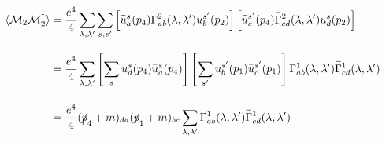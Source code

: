 \begin{solution}
\begin{enumerate}[label=(\alph*)]
    \begin{align}
        \expval{\mathcal{M}_2\mathcal{M}_2^\dagger} &= \frac{e^4}{4}  \sum_{\lambda,\lambda'} \sum_{s,s'} \left[  \overbar{u}^s_a(p_4) \Gamma^2_{ab}(\lambda,\lambda')u^{s'}_b(p_2)\right] \left[  \overbar{u}^{s'}_c(p_4)\overbar{\Gamma}^2_{cd}(\lambda,\lambda')u^s_d(p_2)\right] \nonumber \\[0.12in]
        &=  \frac{e^4}{4} \sum_{\lambda,\lambda'} \left[ \sum_{s} u^s_d(p_4) \overbar{u}^s_a(p_4) \right]  \left[ \sum_{s'}u^{s'}_b(p_1)   \overbar{u}^{s'}_c(p_1) \right] \Gamma^1_{ab}(\lambda,\lambda') \overbar{\Gamma}^1_{cd}(\lambda,\lambda') \nonumber \\[0.15in]
        &= \frac{e^4}{4}  (\pslash_4+m)_{da}  (\pslash_1+m)_{bc}  \sum_{\lambda,\lambda'} \Gamma^1_{ab}(\lambda,\lambda') \overbar{\Gamma}^1_{cd}(\lambda,\lambda') \label{P6.12.1}
    \end{align}\\
\end{enumerate}
\end{solution}



